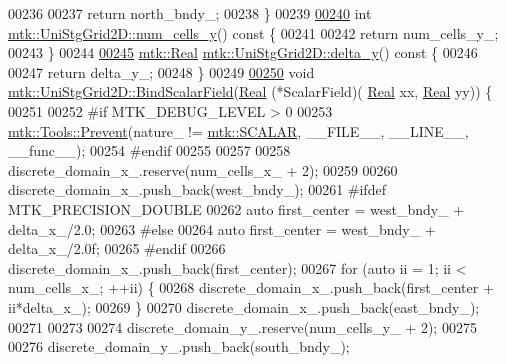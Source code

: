 \begin{DoxyCode}
00236 
00237   \textcolor{keywordflow}{return} north\_bndy\_;
00238 \}
00239 
\hypertarget{mtk__uni__stg__grid__2d_8cc_source_l00240}{}\hyperlink{classmtk_1_1UniStgGrid2D_aed05a801cc9a76dba0ff203cea58a61a}{00240} \textcolor{keywordtype}{int} \hyperlink{classmtk_1_1UniStgGrid2D_aed05a801cc9a76dba0ff203cea58a61a}{mtk::UniStgGrid2D::num\_cells\_y}()\textcolor{keyword}{ const }\{
00241 
00242   \textcolor{keywordflow}{return} num\_cells\_y\_;
00243 \}
00244 
\hypertarget{mtk__uni__stg__grid__2d_8cc_source_l00245}{}\hyperlink{classmtk_1_1UniStgGrid2D_a65a78cfc80ffdbeb282ed57af4dc5cb4}{00245} \hyperlink{group__c01-roots_gac080bbbf5cbb5502c9f00405f894857d}{mtk::Real} \hyperlink{classmtk_1_1UniStgGrid2D_a65a78cfc80ffdbeb282ed57af4dc5cb4}{mtk::UniStgGrid2D::delta\_y}()\textcolor{keyword}{ const }\{
00246 
00247   \textcolor{keywordflow}{return} delta\_y\_;
00248 \}
00249 
\hypertarget{mtk__uni__stg__grid__2d_8cc_source_l00250}{}\hyperlink{classmtk_1_1UniStgGrid2D_ab6aff36e9f89fba1c1ff4f9914508211}{00250} \textcolor{keywordtype}{void} \hyperlink{classmtk_1_1UniStgGrid2D_ab6aff36e9f89fba1c1ff4f9914508211}{mtk::UniStgGrid2D::BindScalarField}(\hyperlink{group__c01-roots_gac080bbbf5cbb5502c9f00405f894857d}{Real} (*ScalarField)(
      \hyperlink{group__c01-roots_gac080bbbf5cbb5502c9f00405f894857d}{Real} xx, \hyperlink{group__c01-roots_gac080bbbf5cbb5502c9f00405f894857d}{Real} yy)) \{
00251 
00252 \textcolor{preprocessor}{  #if MTK\_DEBUG\_LEVEL > 0}
00253   \hyperlink{classmtk_1_1Tools_afe5bb096309258e2e72503fd7b41c7e0}{mtk::Tools::Prevent}(nature\_ != \hyperlink{namespacemtk_ga4c54f2a329cfb4e56213b02a259d19e2af481d45bd70d41381c7d72e200889205}{mtk::SCALAR}, \_\_FILE\_\_, \_\_LINE\_\_, \_\_func\_\_);
00254 \textcolor{preprocessor}{  #endif}
00255 
00257 
00258   discrete\_domain\_x\_.reserve(num\_cells\_x\_ + 2);
00259 
00260   discrete\_domain\_x\_.push\_back(west\_bndy\_);
00261 \textcolor{preprocessor}{  #ifdef MTK\_PRECISION\_DOUBLE}
00262   \textcolor{keyword}{auto} first\_center = west\_bndy\_ + delta\_x\_/2.0;
00263 \textcolor{preprocessor}{  #else}
00264   \textcolor{keyword}{auto} first\_center = west\_bndy\_ + delta\_x\_/2.0f;
00265 \textcolor{preprocessor}{  #endif}
00266   discrete\_domain\_x\_.push\_back(first\_center);
00267   \textcolor{keywordflow}{for} (\textcolor{keyword}{auto} ii = 1; ii < num\_cells\_x\_; ++ii) \{
00268     discrete\_domain\_x\_.push\_back(first\_center + ii*delta\_x\_);
00269   \}
00270   discrete\_domain\_x\_.push\_back(east\_bndy\_);
00271 
00273 
00274   discrete\_domain\_y\_.reserve(num\_cells\_y\_ + 2);
00275 
00276   discrete\_domain\_y\_.push\_back(south\_bndy\_);

\end{DoxyCode}
